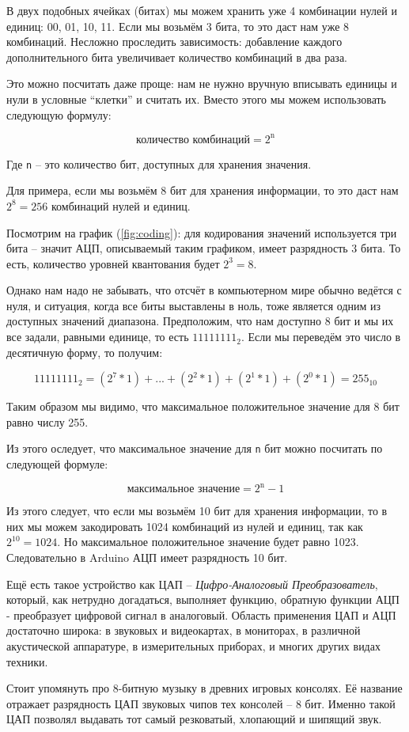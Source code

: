 \documentclass[../sparc.tex]{subfiles}
\begin{document}
В двух подобных ячейках (битах) мы можем хранить уже 4 комбинации нулей и
единиц: 00, 01, 10, 11.  Если мы возьмём 3 бита, то это даст нам уже 8
комбинаций.  Несложно проследить зависимость: добавление каждого дополнительного
бита увеличивает количество комбинаций в два раза.

Это можно посчитать даже проще: нам не нужно вручную вписывать единицы и нули в
условные ``клетки'' и считать их.  Вместо этого мы можем использовать следующую
формулу:

\begin{equation}
  \mbox{количество комбинаций} = 2^{\mbox{n}}
\end{equation}

Где \texttt{n} -- это количество бит, доступных для хранения значения.

Для примера, если мы возьмём 8 бит для хранения информации, то это даст нам $2^8
= 256$ комбинаций нулей и единиц.

Посмотрим на график (\ref{fig:coding}): для кодирования значений используется
три бита -- значит АЦП, описываемый таким графиком, имеет разрядность 3 бита.  То
есть, количество уровней квантования будет $2^3 = 8$.

Однако нам надо не забывать, что отсчёт в компьютерном мире обычно ведётся с
нуля, и ситуация, когда все биты выставлены в ноль, тоже является одним из
доступных значений диапазона.  Предположим, что нам доступно 8 бит и мы их все
задали, равными единице, то есть $11111111_2$.  Если мы переведём это число в
десятичную форму, то получим:

\begin{equation}
  11111111_2 = (2^7 * 1) + \mbox{...} + (2^2 * 1) + (2^1 * 1) + (2^0 * 1) = 255_{10}
\end{equation}

Таким образом мы видимо, что максимальное положительное значение для 8 бит равно
числу 255.

Из этого оследует, что максимальное значение для \texttt{n} бит можно посчитать
по следующей формуле:

\begin{equation}
  \mbox{максимальное значение} = 2^{\mbox{n}} - 1
\end{equation}

Из этого следует, что если мы возьмём 10 бит для хранения информации, то в них
мы можем закодировать 1024 комбинаций из нулей и единиц, так как $2^{10} =
1024$.  Но максимальное положительное значение будет равно 1023.  Следовательно
в Arduino АЦП имеет разрядность 10 бит.

Ещё есть такое устройство как ЦАП -- \emph{Цифро-Аналоговый Преобразователь},
который, как нетрудно догадаться, выполняет функцию, обратную функции АЦП -
преобразует цифровой сигнал в аналоговый. Область применения ЦАП и АЦП
достаточно широка: в звуковых и видеокартах, в мониторах, в различной
акустической аппаратуре, в измерительных приборах, и многих других видах
техники.

Стоит упомянуть про 8-битную музыку в древних игровых консолях. Её название
отражает разрядность ЦАП звуковых чипов тех консолей -- 8 бит. Именно такой ЦАП
позволял выдавать тот самый резковатый, хлопающий и шипящий звук.
\end{document}
